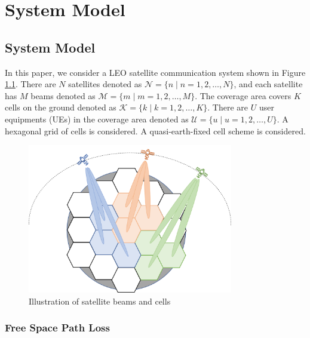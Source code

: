 \chapter{System Model}
\label{chap:model}


\section{System Model}

In this paper, we consider a LEO satellite communication system shown in Figure \ref{fig_sat}. There are $N$ satellites denoted as $\mathcal{N} = \{n \mid n = 1, 2, \ldots, N\}$, and each satellite has $M$ beams denoted as $\mathcal{M} = \{m \mid m = 1, 2, \ldots, M\}$. The coverage area covers $K$ cells on the ground denoted as $\mathcal{K} = \{k \mid k = 1, 2, \ldots, K\}$. There are $U$ user equipments (UEs) in the coverage area denoted as $\mathcal{U} = \{u \mid u = 1, 2, \ldots, U\}$. A hexagonal grid of cells is considered. A quasi-earth-fixed cell scheme is considered.

\begin{figure}[h!]
    \centering
    \includegraphics[width=0.8\textwidth]{satellites_cells.png}
    \caption{Illustration of satellite beams and cells}
    \label{fig_sat}
\end{figure}

\subsection{Free Space Path Loss}

